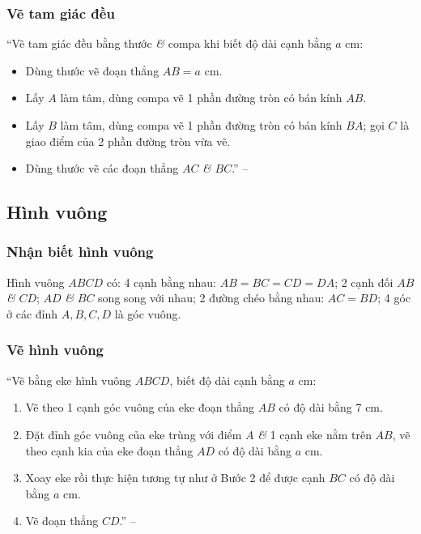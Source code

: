 \documentclass[oneside]{book}
\numberwithin{equation}{section}
\begin{document}
\subsubsection{Vẽ tam giác đều}
``Vẽ tam giác đều bằng thước \textit{\&} compa khi biết độ dài cạnh bằng $a$ cm:
\begin{itemize}
	\item Dùng thước vẽ đoạn thẳng $AB = a$ cm.
	\item Lấy $A$ làm tâm, dùng compa vẽ 1 phần đường tròn có bán kính $AB$.
	\item Lấy $B$ làm tâm, dùng compa vẽ 1 phần đường tròn có bán kính $BA$; gọi $C$ là giao điểm của 2 phần đường tròn vừa vẽ.
	\item Dùng thước vẽ các đoạn thẳng $AC$ \textit{\&} $BC$.'' -- \cite[p. 94]{Thai_Anh_Dat_Ha_Loan_Nam_Quang_Toan_6_tap_1}
\end{itemize}

\subsection{Hình vuông}

\subsubsection{Nhận biết hình vuông}
Hình vuông $ABCD$ có: 4 cạnh bằng nhau: $AB = BC = CD = DA$; 2 cạnh đối $AB$ \textit{\&} $CD$; $AD$ \textit{\&} $BC$ song song với nhau; 2 đường chéo bằng nhau: $AC = BD$; 4 góc ở các đỉnh $A,B,C,D$ là góc vuông.

\subsubsection{Vẽ hình vuông}
``Vẽ bằng eke hình vuông $ABCD$, biết độ dài cạnh bằng $a$ cm:
\begin{enumerate}
	\item Vẽ theo 1 cạnh góc vuông của eke đoạn thẳng $AB$ có độ dài bằng 7 cm.
	\item Đặt đỉnh góc vuông của eke trùng với điểm $A$ \textit{\&} 1 cạnh eke nằm trên $AB$, vẽ theo cạnh kia của eke đoạn thẳng $AD$ có độ dài bằng $a$ cm.
	\item Xoay eke rồi thực hiện tương tự như ở Bước 2 để được cạnh $BC$ có độ dài bằng $a$ cm.
	\item Vẽ đoạn thẳng $CD$.'' -- \cite[p. 95]{Thai_Anh_Dat_Ha_Loan_Nam_Quang_Toan_6_tap_1}
\end{enumerate}
\end{document}
